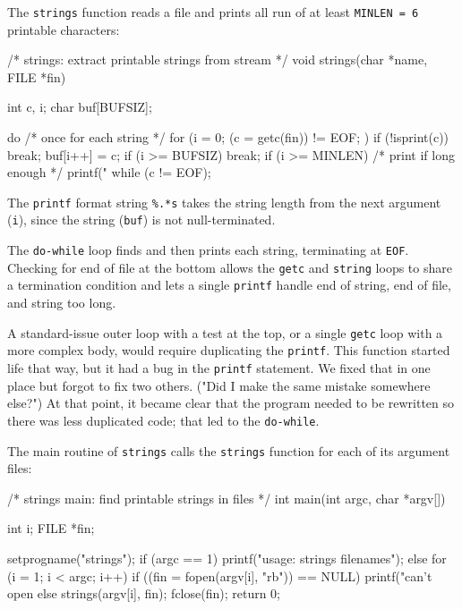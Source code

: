 The \verb'strings' function reads a file and prints all run of at least
\verb'MINLEN = 6' printable characters:
\begin{wellcode}
    /* strings: extract printable strings from stream */
    void strings(char *name, FILE *fin)
    {
        int c, i;
        char buf[BUFSIZ];

        do {    /* once for each string */
            for (i = 0; (c = getc(fin)) != EOF;  ) {
                if (!isprint(c))
                    break;
                buf[i++] = c;
                if (i >= BUFSIZ)
                    break;
            }
            if (i >= MINLEN) /* print if long enough */
                printf("%
        } while (c != EOF);
    }
\end{wellcode}
The \verb'printf' format string \verb'%.*s' takes the string length from
the next argument (\verb'i'), since the string (\verb'buf') is not
null-terminated.

The \verb'do-while' loop finds and then prints each string, terminating at
\verb'EOF'.  Checking for end of file at the bottom allows the \verb'getc'
and \verb'string' loops to share a termination condition and lets a single
\verb'printf' handle end of string, end of file, and string too long.

A standard-issue outer loop with a test at the top, or a single \verb'getc'
loop with a more complex body, would require duplicating the \verb'printf'.
This function started life that way, but it had a bug in the \verb'printf'
statement. We fixed that in one place but forgot to fix two others. ("Did I
make the same mistake somewhere else?") At that point, it became clear that
the program needed to be rewritten so there was less duplicated code; that
led to the \verb'do-while'.

The main routine of \verb'strings' calls the \verb'strings' function for
each of its argument files:
\begin{wellcode}
    /* strings main: find printable strings in files */
    int main(int argc, char *argv[])
    {
        int     i;
        FILE    *fin;

        setprogname("strings");
        if (argc == 1)
            printf("usage: strings filenames");
        else {
            for (i = 1; i < argc; i++) {
                if ((fin = fopen(argv[i], "rb")) == NULL)
                    printf("can't open %
                else {
                    strings(argv[i], fin);
                    fclose(fin);
                }
            }
        }
        return 0;
    }
\end{wellcode}

